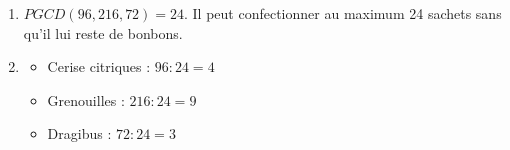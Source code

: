 %
%
    \begin{enumerate}
        \item \(PGCD(96, 216, 72) = 24\).
              Il peut confectionner au maximum 24 sachets sans qu'il lui reste de bonbons.
        \item
        \begin{itemize}
            \item Cerise citriques : \(96 : 24 = 4\)
            \item Grenouilles : \(216 : 24 = 9\)
            \item Dragibus : \(72 : 24 = 3\)
        \end{itemize}
    \end{enumerate}
